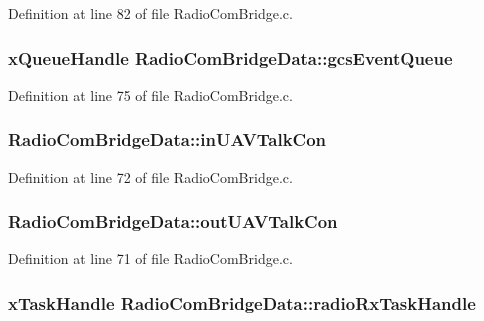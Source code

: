 \-Definition at line 82 of file \-Radio\-Com\-Bridge.\-c.

\hypertarget{struct_radio_com_bridge_data_aacd7e5ae2cc543712ed4902c62ea4114}{
\subsubsection[{gcs\-Event\-Queue}]{\setlength{\rightskip}{0pt plus 5cm}x\-Queue\-Handle {\bf \-Radio\-Com\-Bridge\-Data\-::gcs\-Event\-Queue}}}\label{struct_radio_com_bridge_data_aacd7e5ae2cc543712ed4902c62ea4114}


\-Definition at line 75 of file \-Radio\-Com\-Bridge.\-c.

\hypertarget{struct_radio_com_bridge_data_af682c724d4e325caaccb297cc349911d}{
\subsubsection[{in\-U\-A\-V\-Talk\-Con}]{ {\bf \-Radio\-Com\-Bridge\-Data\-::in\-U\-A\-V\-Talk\-Con}}}\label{struct_radio_com_bridge_data_af682c724d4e325caaccb297cc349911d}


\-Definition at line 72 of file \-Radio\-Com\-Bridge.\-c.

\hypertarget{struct_radio_com_bridge_data_afd3b3b69c1cdea1fed445a0c2fd40319}{
\subsubsection[{out\-U\-A\-V\-Talk\-Con}]{ {\bf \-Radio\-Com\-Bridge\-Data\-::out\-U\-A\-V\-Talk\-Con}}}\label{struct_radio_com_bridge_data_afd3b3b69c1cdea1fed445a0c2fd40319}


\-Definition at line 71 of file \-Radio\-Com\-Bridge.\-c.

\hypertarget{struct_radio_com_bridge_data_a4c820a9e2bc40a76c43488fa46c8483e}{
\subsubsection[{radio\-Rx\-Task\-Handle}]{\setlength{\rightskip}{0pt plus 5cm}x\-Task\-Handle {\bf \-Radio\-Com\-Bridge\-Data\-::radio\-Rx\-Task\-Handle}}}\label{struct_radio_com_bridge_data_a4c820a9e2bc40a76c43488fa46c8483e}


